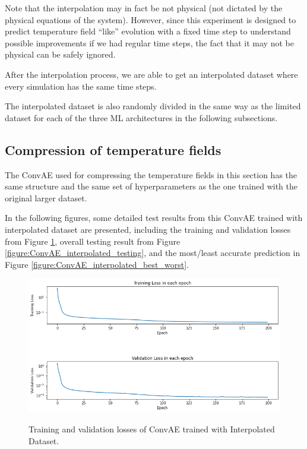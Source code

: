 Note that the interpolation may in fact be not physical (not dictated by the physical equations of the system). However, since this experiment is designed to predict temperature field ``like'' evolution with a fixed time step to understand possible improvements if we had regular time steps, the fact that it may not be physical can be safely ignored.

After the interpolation process, we are able to get an interpolated dataset where every simulation has the same time steps.

The interpolated dataset is also randomly divided in the same way as the limited dataset for each of the three ML architectures in the following subsections.


\subsection{Compression of temperature fields}

The ConvAE used for compressing the temperature fields in this section has the same structure and the same set of hyperparameters as the one trained with the original larger dataset.

In the following figures, some detailed test results from this ConvAE trained with interpolated dataset are presented, including the training and validation losses from Figure \ref{figure:ConvAE_interpolated_losses}, overall testing result from Figure \ref{figure:ConvAE_interpolated_testing}, and the most/least accurate prediction in Figure \ref{figure:ConvAE_interpolated_best_worst}.


\begin{figure}[H]
    \caption{Training and validation losses of ConvAE trained with Interpolated Dataset.}
    \includegraphics[scale=0.6]{figures/mantle_convection_images/larger_dataset_interpolated/ConvAE_trainingData.png}
    \label{figure:ConvAE_interpolated_losses}
\end{figure}


